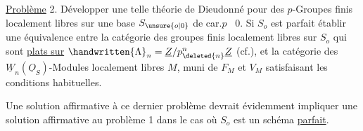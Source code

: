 \uline{Problème} 2. Développer une telle théorie de Dieudonné pour des $p$-Groupes finis localement libres sur une base $S_{\unsure{o|0}}$ de car.$p$ \ $0$. Si $S_o$ est parfait établir une équivalence entre la catégorie des groupes finis localement libres sur $S_o$ qui sont \uline{plats sur} $\handwritten{\Lambda}_n=\underline{Z}/p_{\deleted{n}}^n\underline{Z}$ (cf.\qquad), et la catégorie des $\underline{W}_n(\underline{O}_S)$-Modules localement libres $M$, muni de $F_M$ et $V_M$  satisfaisant les conditions habituelles.

Une solution affirmative à ce dernier problème devrait évidemment impliquer une solution affirmative au problème 1 dans le cas où $S_o$ est un schéma \uline{parfait}.
